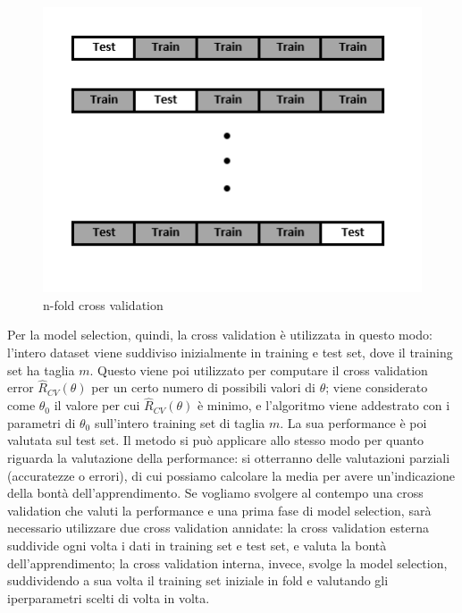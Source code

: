 \documentclass[oneside, openany]{book}
\begin{document}
		\begin{figure}
			\begin{center}
				\begin{minipage}{0.47\textwidth}
					\centering
					\includegraphics[width=\textwidth]{CV1.png}
					\caption{n-fold cross validation}
					\label{fig:crossval}
				\end{minipage}
				
			\end{center}
		\end{figure}
		Per la model selection, quindi, la cross validation è utilizzata in questo modo: l'intero dataset viene suddiviso inizialmente in training e test set, dove il training set ha taglia $m$. Questo viene poi utilizzato per computare il cross validation error $\widehat{R}_{CV}(\theta)$ per un certo numero di possibili valori di $\theta$; viene considerato come $\theta_0$ il valore per cui $\widehat{R}_{CV}(\theta)$ è minimo, e l'algoritmo viene addestrato con i parametri di $\theta_0$ sull'intero training set di taglia $m$. La sua performance è poi valutata sul test set.
		Il metodo si può applicare allo stesso modo per quanto riguarda la valutazione della performance: si otterranno delle valutazioni parziali (accuratezze o errori), di cui possiamo calcolare la media per avere un'indicazione della bontà dell'apprendimento. Se vogliamo svolgere al contempo una cross validation che valuti la performance e una prima fase di model selection, sarà necessario utilizzare due cross validation annidate: la cross validation esterna suddivide ogni volta i dati in training set e test set, e valuta la bontà dell'apprendimento; la cross validation interna, invece, svolge la model selection, suddividendo a sua volta il training set iniziale in fold e valutando gli iperparametri scelti di volta in volta.
		
\end{document}
